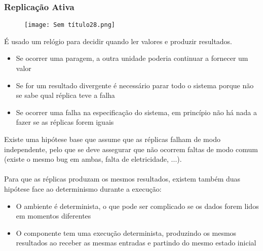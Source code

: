 \documentclass[10pt,a4paper]{report}
\begin{document}
\subsubsection{Replicação Ativa}
\begin{figure}[H]
\centering
\texttt{[image: Sem título28.png]}
\end{figure}
É usado um relógio para decidir quando ler valores e produzir resultados.
\begin{itemize}
\item Se ocorrer uma paragem, a outra unidade poderia continuar a fornecer um valor
\item Se for um resultado divergente é necessário parar todo o sistema porque não se sabe qual réplica teve a falha
\item Se ocorrer uma falha na especificação do sistema, em princípio não há nada a fazer se as réplicas forem iguais
\end{itemize}
Existe uma hipótese base que assume que as réplicas falham de modo independente, pelo que se deve assegurar que não ocorrem faltas de modo comum (existe o mesmo bug em ambas, falta de eletricidade, ...).\\
\\
Para que as réplicas produzam os mesmos resultados, existem também duas hipótese face ao determinismo durante a execução:
\begin{itemize}
\item O ambiente é determinista, o que pode ser complicado se os dados forem lidos em momentos diferentes
\item O componente tem uma execução determinista, produzindo os mesmos resultados ao receber as mesmas entradas e partindo do mesmo estado inicial
\end{itemize}
\end{document}
